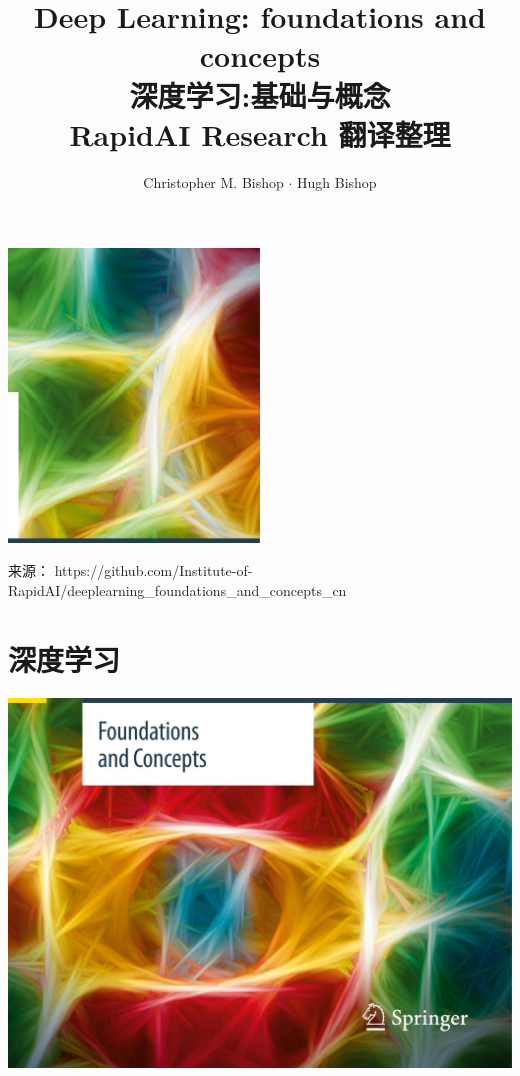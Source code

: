 \documentclass[10pt]{article}
\title{Deep Learning: foundations and concepts \\ 深度学习:基础与概念 \\ RapidAI Research 翻译整理 }
\author{Christopher M. Bishop \(\cdot\) Hugh Bishop}
\begin{document}
\maketitle
\begin{center}
	\includegraphics[max width=0.5\textwidth]{images/0194e279-9b28-703a-88f4-c3ac21e2010d_0_968_0_675_789_0.jpg}
\end{center}

来源： https://github.com/Institute-of-RapidAI/deeplearning\_foundations\_and\_concepts\_cn

\tableofcontents



\hspace*{3em} 

\section*{深度学习}

\begin{center}
\includegraphics[max width=1.0\textwidth]{images/0194e279-9b28-703a-88f4-c3ac21e2010d_0_0_1124_1643_1207_0.jpg}
\end{center}
\hspace*{3em} 
\end{document}
